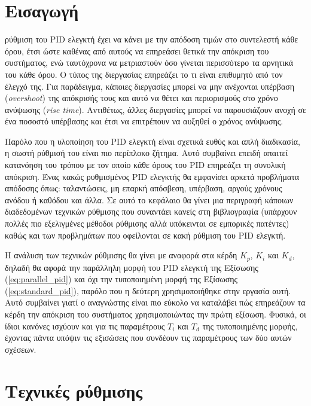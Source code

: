 


\section{Εισαγωγή}

\lettrine[findent=2pt]{}{} ρύθμιση του PID ελεγκτή έχει να κάνει με την απόδοση τιμών στο συντελεστή κάθε όρου, έτσι ώστε καθένας από αυτούς να επηρεάσει θετικά την απόκριση του συστήματος, ενώ ταυτόχρονα να μετριαστούν όσο γίνεται περισσότερο τα αρνητικά του κάθε όρου. Ο τύπος της διεργασίας επηρεάζει το τι είναι επιθυμητό από τον έλεγχό της. Για παράδειγμα, κάποιες διεργασίες μπορεί να μην ανέχονται υπέρβαση (\emph{overshoot}) της απόκρισής τους και αυτό να θέτει και περιορισμούς στο χρόνο ανύψωσης (\emph{rise time}). Αντιθέτως, άλλες διεργασίες μπορεί να παρουσιάζουν ανοχή σε ένα ποσοστό υπέρβασης και έτσι να επιτρέπουν να αυξηθεί ο χρόνος ανύψωσης.

Παρόλο που η υλοποίηση του PID ελεγκτή είναι σχετικά ευθύς και απλή διαδικασία, η σωστή ρύθμισή του είναι πιο περίπλοκο ζήτημα. Αυτό συμβαίνει επειδή απαιτεί κατανόηση του τρόπου με τον οποίο κάθε όρους του PID επηρεάζει τη συνολική απόκριση. Ένας κακώς ρυθμισμένος PID ελεγκτής θα εμφανίσει αρκετά προβλήματα απόδοσης όπως: ταλαντώσεις, μη επαρκή απόσβεση, υπέρβαση, αργούς χρόνους ανόδου ή καθόδου και άλλα. Σε αυτό το κεφάλαιο θα γίνει μια περιγραφή κάποιων διαδεδομένων τεχνικών ρύθμισης που συναντάει κανείς στη βιβλιογραφία (υπάρχουν πολλές πιο εξελιγμένες μέθοδοι ρύθμισης αλλά υπόκεινται σε εμπορικές πατέντες) καθώς και των προβλημάτων που οφείλονται σε κακή ρύθμιση του PID ελεγκτή.

Η ανάλυση των τεχνικών ρύθμισης θα γίνει με αναφορά στα κέρδη $K_p$, $K_i$ και $K_d$, δηλαδή θα αφορά την παράλληλη μορφή του PID ελεγκτή της Εξίσωσης (\ref{eq:parallel_pid}) και όχι την τυποποιημένη μορφή της Εξίσωσης (\ref{eq:standard_pid}), παρόλο που η δεύτερη χρησιμοποιήθηκε στην εργασία αυτή. Αυτό συμβαίνει γιατί ο αναγνώστης είναι πιο εύκολο να καταλάβει πώς επηρεάζουν τα κέρδη την απόκριση του συστήματος χρησιμοποιώντας την πρώτη εξίσωση. Φυσικά, οι ίδιοι κανόνες ισχύουν και για τις παραμέτρους $T_i$ και $T_d$ της τυποποιημένης μορφής, έχοντας πάντα υπόψιν τις εξισώσεις που συνδέουν τις παραμέτρους των δύο αυτών σχέσεων.

\section{Τεχνικές ρύθμισης}

